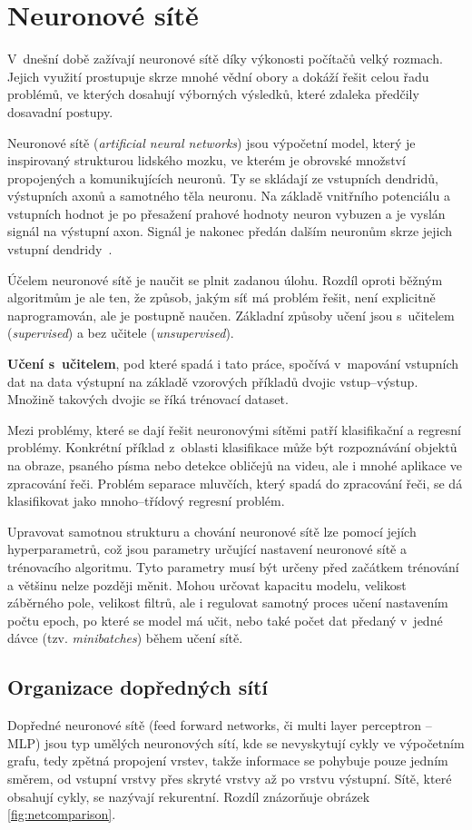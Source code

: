 \chapter{Neuronové sítě}
\label{neuronovky}
V~dnešní době zažívají neuronové sítě díky výkonosti počítačů velký rozmach. Jejich využití prostupuje skrze mnohé vědní obory a dokáží řešit celou řadu problémů, ve kterých dosahují výborných výsledků, které zdaleka předčily dosavadní postupy. 

Neuronové sítě (\textit{artificial neural networks}) jsou výpočetní model, který je inspirovaný strukturou lidského mozku, ve kterém je obrovské množství propojených a komunikujících neuronů. Ty se skládají ze vstupních dendridů, výstupních axonů a samotného těla neuronu. Na základě vnitřního potenciálu a vstupních hodnot je po přesažení prahové hodnoty neuron vybuzen a je vyslán signál na výstupní axon. Signál je nakonec předán dalším neuronům skrze jejich vstupní dendridy~\cite{mitdeeplearning_small}.

Účelem neuronové sítě je naučit se plnit zadanou úlohu. Rozdíl oproti běžným algoritmům je ale ten, že způsob, jakým síť má problém řešit, není explicitně naprogramován, ale je postupně naučen. Základní způsoby učení jsou s~učitelem (\textit{supervised}) a bez učitele (\textit{unsupervised}). 

\textbf{Učení s~učitelem}, pod které spadá i tato práce, spočívá v~mapování vstupních dat na data výstupní na základě vzorových příkladů dvojic vstup--výstup. Množině takových dvojic se říká trénovací dataset.

Mezi problémy, které se dají řešit neuronovými sítěmi patří klasifikační a regresní problémy. Konkrétní příklad z~oblasti klasifikace může být rozpoznávání objektů na obraze, psaného písma nebo detekce obličejů na videu, ale i mnohé aplikace ve zpracování řeči. Problém separace mluvčích, který spadá do zpracování řeči, se dá klasifikovat jako mnoho--třídový regresní problém.

Upravovat samotnou strukturu a chování neuronové sítě lze pomocí jejích hyperparametrů, což jsou parametry určující nastavení neuronové sítě a trénovacího algoritmu. Tyto parametry musí být určeny před začátkem trénování a většinu nelze později měnit. Mohou určovat kapacitu modelu, velikost záběrného pole, velikost filtrů, ale i regulovat samotný proces učení nastavením počtu epoch, po které se model má učit, nebo také počet dat předaný v~jedné dávce (tzv. \textit{minibatches}) během učení sítě.


\section{Organizace dopředných sítí}
Dopředné neuronové sítě (feed forward networks, či multi layer perceptron -- MLP) jsou typ umělých neuronových sítí, kde se nevyskytují cykly ve výpočetním grafu, tedy zpětná propojení vrstev, takže informace se pohybuje pouze jedním směrem, od vstupní vrstvy přes skryté vrstvy až po vrstvu výstupní. Sítě, které obsahují cykly, se nazývají rekurentní. Rozdíl znázorňuje obrázek \ref{fig:netcomparison}.

